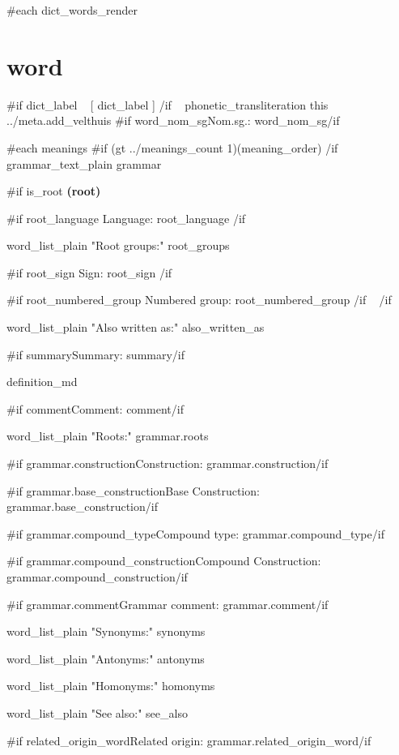 \documentclass[11pt, a4paper, landscape, oneside, twocolumn]{memoir}
\begin{document}
{\raggedright

{{#each dict_words_render}}

\section{%
{{word}}%
}

{{#if dict_label ~}}
[%
{{dict_label}}%
]
{{/if ~}}
{{phonetic_transliteration this ../meta.add_velthuis}}
{{#if word_nom_sg}}Nom.sg.: {{word_nom_sg}}{{/if}}

{{#each meanings}}
{{#if (gt ../meanings_count 1)}}({{meaning_order}}) {{/if}} {{grammar_text_plain grammar}}

{{#if is_root}}
\textbf{(root)}

{{#if root_language}}
Language: {{root_language}}
{{/if ~}}

{{word_list_plain "Root groups:" root_groups ~}}

{{#if root_sign}}
Sign: {{root_sign}}
{{/if ~}}

{{#if root_numbered_group}}
Numbered group: {{root_numbered_group}}
{{/if ~}}
{{/if ~}}

{{word_list_plain "Also written as:" also_written_as}}

{{#if summary}}Summary: {{summary}}{{/if}}

{{definition_md}}

{{#if comment}}Comment: {{comment}}{{/if}}

{{word_list_plain "Roots:" grammar.roots}}

{{#if grammar.construction}}Construction: {{grammar.construction}}{{/if}}

{{#if grammar.base_construction}}Base Construction: {{grammar.base_construction}}{{/if}}

{{#if grammar.compound_type}}Compound type: {{grammar.compound_type}}{{/if}}

{{#if grammar.compound_construction}}Compound Construction: {{grammar.compound_construction}}{{/if}}

{{#if grammar.comment}}Grammar comment: {{grammar.comment}}{{/if}}

{{word_list_plain "Synonyms:" synonyms}}

{{word_list_plain "Antonyms:" antonyms}}

{{word_list_plain "Homonyms:" homonyms}}

{{word_list_plain "See also:" see_also}}

{{#if related_origin_word}}Related origin: {{grammar.related_origin_word}}{{/if}}

}
\end{document}
